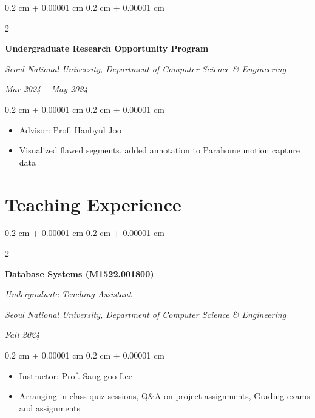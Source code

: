 \documentclass[10pt, letterpaper]{article}
\newenvironment{highlights}{
    \begin{itemize}[
        topsep=0.10 cm,
        parsep=0.10 cm,
        partopsep=0pt,
        itemsep=0pt,
        leftmargin=0.4 cm + 10pt
    ]
}{
    \end{itemize}
} %
\newenvironment{onecolentry}{
    \begin{adjustwidth}{
        0.2 cm + 0.00001 cm
    }{
        0.2 cm + 0.00001 cm
    }
}{
    \end{adjustwidth}
} %
\newenvironment{twocolentry}[2][]{
    \onecolentry
    \def\secondColumn{#2}
    \setcolumnwidth{\fill, 4.5 cm}
    \begin{paracol}{2}
}{
    \switchcolumn \raggedleft \secondColumn
    \end{paracol}
    \endonecolentry
} %
\begin{document}
        \vspace{0.3 cm}

        \begin{twocolentry}{
            
        \textit{Mar 2024 – May 2024}}
            \textbf{Undergraduate Research Opportunity Program}
            
            \textit{Seoul National University,  Department of Computer Science \& Engineering}
        \end{twocolentry}

        \vspace{0.10 cm}
        \begin{onecolentry}
            \begin{highlights}
                \item Advisor: Prof. Hanbyul Joo
                \item Visualized flawed segments, added annotation to Parahome motion capture data
            \end{highlights}
        \end{onecolentry}
         

    \section{Teaching Experience}

        \begin{twocolentry}{
            
        \textit{Fall 2024}}
            \textbf{Database Systems (M1522.001800)}
            
            \textit{Undergraduate Teaching Assistant}
    
            \textit{Seoul National University,  Department of Computer Science \& Engineering}
        \end{twocolentry}

        \vspace{0.10 cm}
        \begin{onecolentry}
            \begin{highlights}
                \item Instructor: Prof. Sang-goo Lee
                \item Arranging in-class quiz sessions, Q\&A on project assignments, Grading exams and assignments
            \end{highlights}
        \end{onecolentry}
\end{document}
